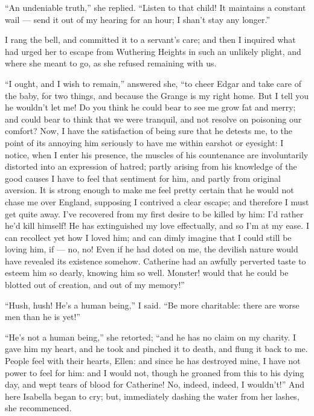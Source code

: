 \par “An undeniable truth,” she replied. “Listen to that child! It maintains a constant wail — send it out of my hearing for an hour; I shan't stay any longer.”
\par I rang the bell, and committed it to a servant's care; and then I inquired what had urged her to escape from Wuthering Heights in such an unlikely plight, and where she meant to go, as she refused remaining with us.
\par “I ought, and I wish to remain,” answered she, “to cheer Edgar and take care of the baby, for two things, and because the Grange is my right home. But I tell you he wouldn't let me! Do you think he could bear to see me grow fat and merry; and could bear to think that we were tranquil, and not resolve on poisoning our comfort? Now, I have the satisfaction of being sure that he detests me, to the point of its annoying him seriously to have me within earshot or eyesight: I notice, when I enter his presence, the muscles of his countenance are involuntarily distorted into an expression of hatred; partly arising from his knowledge of the good causes I have to feel that sentiment for him, and partly from original aversion. It is strong enough to make me feel pretty certain that he would not chase me over England, supposing I contrived a clear escape; and therefore I must get quite away. I've recovered from my first desire to be killed by him: I'd rather he'd kill himself! He has extinguished my love effectually, and so I'm at my ease. I can recollect yet how I loved him; and can dimly imagine that I could still be loving him, if — no, no! Even if he had doted on me, the devilish nature would have revealed its existence somehow. Catherine had an awfully perverted taste to esteem him so dearly, knowing him so well. Monster! would that he could be blotted out of creation, and out of my memory!”
\par “Hush, hush! He's a human being,” I said. “Be more charitable: there are worse men than he is yet!”
\par “He's not a human being,” she retorted; “and he has no claim on my charity. I gave him my heart, and he took and pinched it to death, and flung it back to me. People feel with their hearts, Ellen: and since he has destroyed mine, I have not power to feel for him: and I would not, though he groaned from this to his dying day, and wept tears of blood for Catherine! No, indeed, indeed, I wouldn't!” And here Isabella began to cry; but, immediately dashing the water from her lashes, she recommenced.
